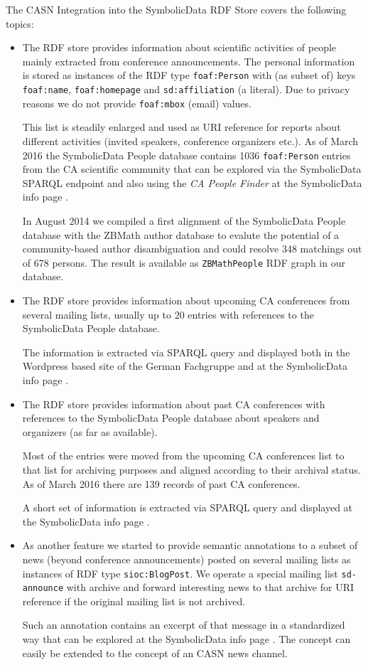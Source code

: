 \documentclass{llncs}
\newcommand{\SD}{{\sc Symbo\-lic\-Data}}
\begin{document}
The CASN Integration into the {\SD} RDF Store covers the following topics:
\begin{itemize}
\item The RDF store provides information about scientific activities of people
  mainly extracted from conference announcements.  The personal information is
  stored as instances of the RDF type \texttt{foaf:Person} with (as subset of)
  keys \texttt{foaf:name}, \texttt{foaf:homepage} and \texttt{sd:affiliation}
  (a literal). Due to privacy reasons we do not provide \texttt{foaf:mbox}
  (email) values.

  This list is steadily enlarged and used as URI reference for reports about
  different activities (invited speakers, conference organizers etc.).  As of
  March 2016 the {\SD} People database contains 1036 \texttt{foaf:Person}
  entries from the CA scientific community that can be explored via the {\SD}
  SPARQL endpoint \cite{sdsparql} and also using the \emph{CA People Finder}
  at the {\SD} info page \cite{sdinfo}.

  In August 2014 we compiled a first alignment of the {\SD} People database
  with the ZBMath author database to evalute the potential of a
  community-based author disambiguation and could resolve 348 matchings out of
  678 persons.  The result is available as \texttt{ZBMathPeople} RDF graph in
  our database.

\item The RDF store provides information about upcoming CA conferences from
  several mailing lists, usually up to 20 entries with references to the {\SD}
  People database.

  The information is extracted via SPARQL query and displayed both in the
  Wordpress based site of the German Fachgruppe \cite{cafg} and at the {\SD}
  info page \cite{sdinfo}.
\item The RDF store provides information about past CA conferences with
  references to the {\SD} People database about speakers and organizers (as
  far as available).

  Most of the entries were moved from the upcoming CA conferences list to that
  list for archiving purposes and aligned according to their archival status.
  As of March 2016 there are 139 records of past CA conferences. 

  A short set of information is extracted via SPARQL query and displayed at
  the {\SD} info page \cite{sdinfo}.
\item As another feature we started to provide semantic annotations to a
  subset of news (beyond conference announcements) posted on several mailing
  lists as instances of RDF type \texttt{sioc:BlogPost}.  We operate a special
  mailing list \texttt{sd-announce} with archive and forward interesting news
  to that archive for URI reference if the original mailing list is not
  archived.

  Such an annotation contains an excerpt of that message in a standardized way
  that can be explored at the {\SD} info page \cite{sdinfo}. The concept
  can easily be extended to the concept of an CASN news channel. 
\end{itemize}
\end{document}
